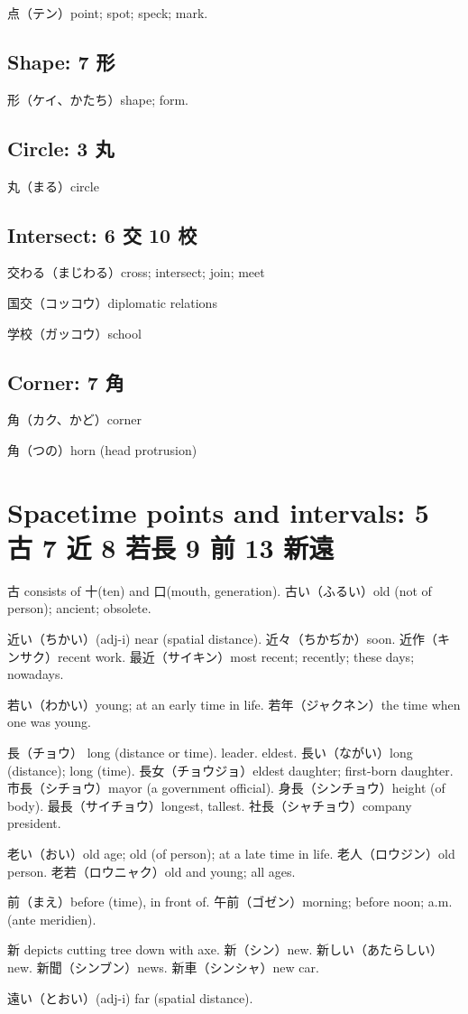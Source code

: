 点（テン）point; spot; speck; mark.

\subsection{Shape: 7 形}

形（ケイ、かたち）shape; form.

\subsection{Circle: 3 丸}

丸（まる）circle

\subsection{Intersect: 6 交 10 校}

交わる（まじわる）cross; intersect; join; meet

国交（コッコウ）diplomatic relations

学校（ガッコウ）school

\subsection{Corner: 7 角}

角（カク、かど）corner

角（つの）horn (head protrusion)

\section{Spacetime points and intervals: 5 古 7 近 8 若長 9 前 13 新遠}

古 consists of 十(ten) and 口(mouth, generation).
古い（ふるい）old (not of person); ancient; obsolete.

近い（ちかい）(adj-i) near (spatial distance).
近々（ちかぢか）soon.
近作（キンサク）recent work.
最近（サイキン）most recent; recently; these days; nowadays.

若い（わかい）young; at an early time in life.
若年（ジャクネン）the time when one was young.

長（チョウ）
long (distance or time).
leader.
eldest.
長い（ながい）long (distance); long (time).
長女（チョウジョ）eldest daughter; first-born daughter.
市長（シチョウ）mayor (a government official).
身長（シンチョウ）height (of body).
最長（サイチョウ）longest, tallest.
社長（シャチョウ）company president.

老い（おい）old age; old (of person); at a late time in life.
老人（ロウジン）old person.
老若（ロウニャク）old and young; all ages.

前（まえ）before (time), in front of.
午前（ゴゼン）morning; before noon; a.m. (ante meridien).

新 depicts cutting tree down with axe.
新（シン）new.
新しい（あたらしい）new.
新聞（シンブン）news.
新車（シンシャ）new car.

遠い（とおい）(adj-i) far (spatial distance).
